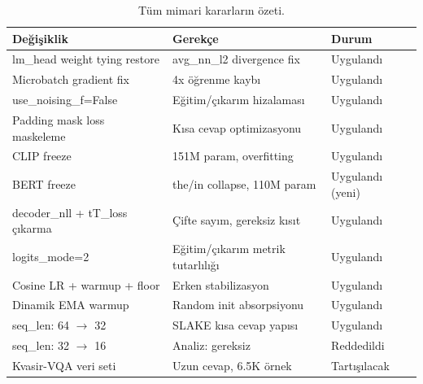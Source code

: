 \documentclass[12pt,a4paper]{article}
\begin{document}
\begin{table}[H]
\centering
\begin{tabular}{p{5.5cm}p{4cm}p{4cm}}
\toprule
\textbf{Değişiklik} & \textbf{Gerekçe} & \textbf{Durum} \\
\midrule
lm\_head weight tying restore  & avg\_nn\_l2 divergence fix & Uygulandı \\
Microbatch gradient fix         & 4x öğrenme kaybı   & Uygulandı \\
use\_noising\_f=False           & Eğitim/çıkarım hizalaması & Uygulandı \\
Padding mask loss maskeleme     & Kısa cevap optimizasyonu & Uygulandı \\
CLIP freeze                     & 151M param, overfitting & Uygulandı \\
BERT freeze                     & the/in collapse, 110M param & Uygulandı (yeni) \\
decoder\_nll + tT\_loss çıkarma & Çifte sayım, gereksiz kısıt & Uygulandı \\
logits\_mode=2                  & Eğitim/çıkarım metrik tutarlılığı & Uygulandı \\
Cosine LR + warmup + floor      & Erken stabilizasyon & Uygulandı \\
Dinamik EMA warmup              & Random init absorpsiyonu & Uygulandı \\
seq\_len: 64 $\to$ 32            & SLAKE kısa cevap yapısı & Uygulandı \\
seq\_len: 32 $\to$ 16            & Analiz: gereksiz             & Reddedildi \\
Kvasir-VQA veri seti            & Uzun cevap, 6.5K örnek       & Tartışılacak \\
\bottomrule
\end{tabular}
\caption{Tüm mimari kararların özeti.}
\end{table}
\end{document}
